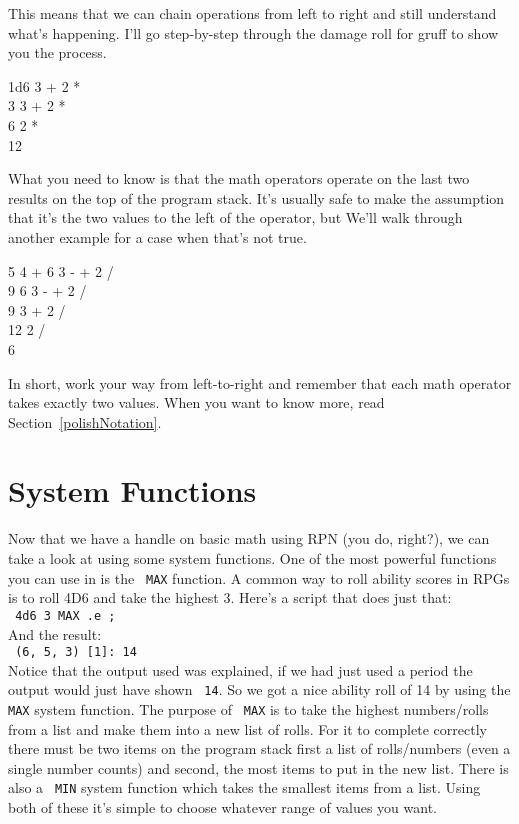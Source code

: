 This means that we can chain operations from left to right and still
understand what's happening. I'll go step-by-step through the
damage roll for gruff to show you the process.
\begin{center}
\begin{tt}
1d6 3 + 2 *\\
3 3 + 2 *\\
6 2 *\\
12\\
\end{tt}
\end{center}
What you need to know is that the math operators operate on the last two results
on the top of the program stack. It's usually safe to make the assumption that
it's the two values to the left of the operator, but We'll walk through another
example for a case when that's not true.\\
\begin{center}
\begin{tt}
5 4 + 6 3 - + 2 /\\
9 6 3 - + 2 /\\
9 3 + 2 /\\
12 2 /\\
6\\
\end{tt}
\end{center}
In short, work your way from left-to-right and remember that each math operator
takes exactly two values. When you want to know more, read 
Section~\ref{polishNotation}.

\section{System Functions}
\label{firstFunction}
Now that we have a handle on basic math using RPN (you do, right?), we can
take a look at using some system functions. One of the most powerful functions
you can use in \progLogo is the \texttt{ MAX} function. A common way to roll
ability scores in RPGs is to roll 4D6 and take the highest 3. Here's a
script that does just that:\\
\texttt{ 4d6 3 MAX .e ;}\\
And the result:\\
\texttt{  (6, 5, 3) [1]: 14}\\
Notice that the output used was explained, if we had just used a period the
output would just have shown \texttt{ 14}. So we got a nice ability roll of 14
by using the \texttt{ MAX} system function. The purpose of \texttt{ MAX} is to take the
highest numbers/rolls from a list and make them into a new list of rolls. For
it to complete correctly there must be two items on the program stack first a
list of rolls/numbers (even a single number counts) and second, the most
items to put in the new list. There is also a \texttt{ MIN} system function
which takes the smallest items from a list. Using both of these it's simple
to choose whatever range of values you want.

